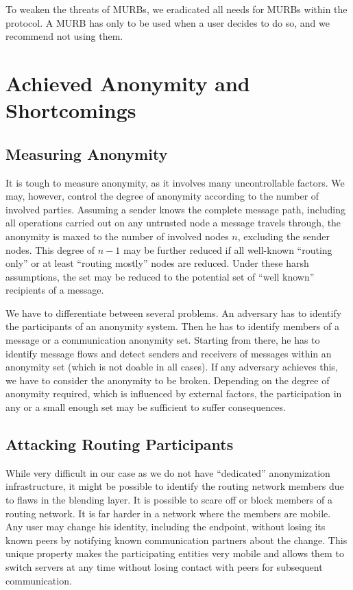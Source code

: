 To weaken the threats of MURBs, we eradicated all needs for MURBs within the protocol. A MURB has only to be used when a user decides to do so, and we recommend not using them.

\section{Achieved Anonymity and Shortcomings}
\subsection{Measuring Anonymity}
It is tough to measure anonymity, as it involves many uncontrollable factors. We may, however, control the degree of anonymity according to the number of involved parties. Assuming a sender knows the complete message path, including all operations carried out on any untrusted node a message travels through, the anonymity is maxed to the number of involved nodes $n$, excluding the sender nodes. This degree of $n-1$ may be further reduced if all well-known ``routing only'' or at least ``routing mostly'' nodes are reduced. Under these harsh assumptions, the set may be reduced to the potential set of ``well known'' recipients of a message.

We have to differentiate between several problems. An adversary has to identify the participants of an anonymity system. Then he has to identify members of a message or a communication anonymity set. Starting from there, he has to identify message flows and detect senders and receivers of messages within an anonymity set (which is not doable in all cases). If any adversary achieves this, we have to consider the anonymity to be broken. Depending on the degree of anonymity required, which is influenced by external factors, the participation in any or a small enough set may be sufficient to suffer consequences.

\subsection{Attacking Routing Participants}
While very difficult in our case as we do not have ``dedicated'' anonymization infrastructure, it might be possible to identify the routing network members due to flaws in the blending layer. It is possible to scare off or block members of a routing network. It is far harder in a network where the members are mobile. Any user may change his identity, including the endpoint, without losing its known peers by notifying known communication partners about the change. This unique property makes the participating entities very mobile and allows them to switch servers at any time without losing contact with peers for subsequent communication.

